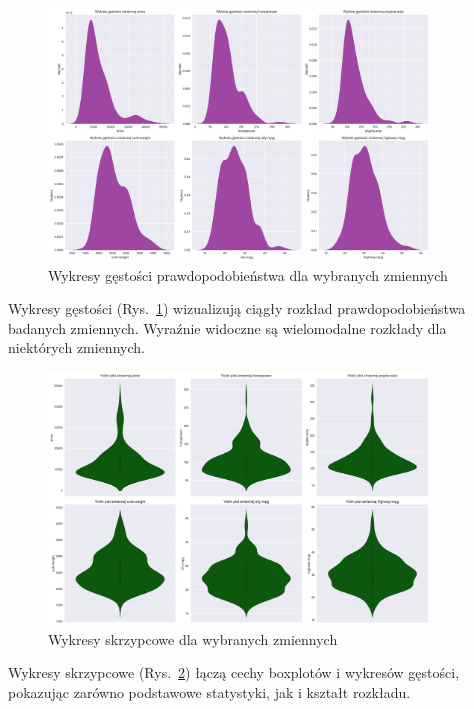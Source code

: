 \documentclass[12pt,a4paper]{article}
\begin{document}
\begin{figure}[H]
    \centering
    \includegraphics[width=0.9\textwidth]{figures/density_plots.png}
    \caption{Wykresy gęstości prawdopodobieństwa dla wybranych zmiennych}
    \label{fig:density_plots}
\end{figure}

Wykresy gęstości (Rys.~\ref{fig:density_plots}) wizualizują ciągły rozkład prawdopodobieństwa badanych zmiennych. Wyraźnie widoczne są wielomodalne rozkłady dla niektórych zmiennych.

\begin{figure}[H]
    \centering
    \includegraphics[width=0.9\textwidth]{figures/violin_plots.png}
    \caption{Wykresy skrzypcowe dla wybranych zmiennych}
    \label{fig:violin_plots}
\end{figure}

Wykresy skrzypcowe (Rys.~\ref{fig:violin_plots}) łączą cechy boxplotów i wykresów gęstości, pokazując zarówno podstawowe statystyki, jak i kształt rozkładu.
\end{document}
